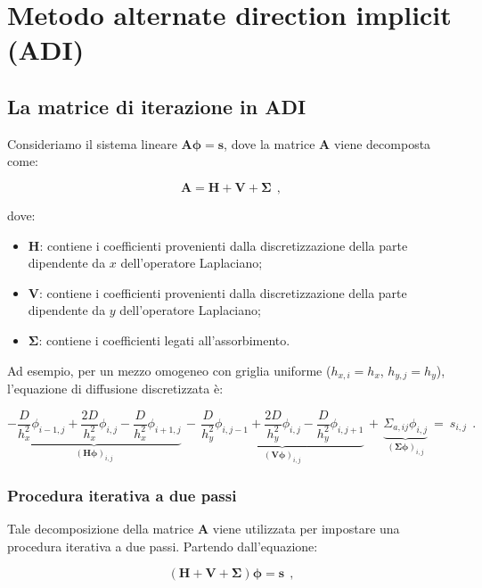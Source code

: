 \chapter{Metodo alternate direction implicit (ADI)}

\section{La matrice di iterazione in ADI}

Consideriamo il sistema lineare \(\mathbf{A} \mathbf{\phi} = \mathbf{s}\), dove la matrice \(\mathbf{A}\) viene decomposta come:

\[
\mathbf{A} = \mathbf{H} + \mathbf{V} + \mathbf{\Sigma}\ \ ,
\]

dove:
\begin{itemize}
	\item \(\mathbf{H}\): contiene i coefficienti provenienti dalla discretizzazione della parte dipendente da \(x\) dell'operatore Laplaciano;
	\item \(\mathbf{V}\): contiene i coefficienti provenienti dalla discretizzazione della parte dipendente da \(y\) dell'operatore Laplaciano;
	\item \(\mathbf{\Sigma}\): contiene i coefficienti legati all'assorbimento.
\end{itemize}

Ad esempio, per un mezzo omogeneo con griglia uniforme (\(h_{x,i} = h_x\), \(h_{y,j} = h_y\)), l'equazione di diffusione discretizzata è:

\[
\underbrace{-\frac{D}{h_x^2} \phi_{i-1,j} + \frac{2D}{h_x^2} \phi_{i,j} - \frac{D}{h_x^2} \phi_{i+1,j}}_{(\mathbf{H} \mathbf{\phi})_{i,j}}\, -\, \underbrace{\frac{D}{h_y^2} \phi_{i,j-1} + \frac{2D}{h_y^2} \phi_{i,j} - \frac{D}{h_y^2} \phi_{i,j+1}}_{(\mathbf{V} \mathbf{\phi})_{i,j}}\, +\, \underbrace{\Sigma_{a,ij} \phi_{i,j}}_{(\mathbf{\Sigma} \mathbf{\phi})_{i,j}}\ =\ s_{i,j}\ \ . 
\]



\subsection{Procedura iterativa a due passi}

Tale decomposizione della matrice \(\mathbf{A}\) viene utilizzata per impostare una procedura iterativa a due passi. Partendo dall'equazione:

\[
(\mathbf{H} + \mathbf{V} + \mathbf{\Sigma}) \mathbf{\phi} = \mathbf{s}\ \ ,
\]

